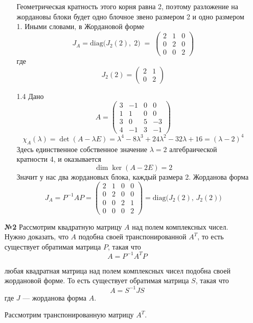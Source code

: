 \documentclass[a4paper]{article}
\begin{document}
\begin{enumerate}
\begin{enumerate}
    Геометрическая кратность этого корня равна 2, поэтому разложение на жордановы 
    блоки будет одно блочное звено размером 2 и одно размером 1.
    Иными словами, в Жордановой форме
    $$
    J_A=\mathrm{diag}\bigl(J_2(2),\;2\bigr)
    \;=\;
    \begin{pmatrix}
    2&1&0\\
    0&2&0\\
    0&0&2
    \end{pmatrix}
    $$
    где
    $$
    J_2(2)=\begin{pmatrix}2&1\\0&2\end{pmatrix}
    $$

    \item[1.4]Дано
    $$
    A=\begin{pmatrix}
    3 & -1 & 0 & 0\\
    1 & 1  & 0 & 0\\
    3 & 0  & 5 & -3\\
    4 & -1 & 3 & -1
    \end{pmatrix}
    $$
    $$
    \chi_A(\lambda)=\det(A-\lambda E)
    =\lambda^4-8\lambda^3+24\lambda^2-32\lambda+16
    =(\lambda-2)^4
    $$
    Здесь единственное собственное значение $\lambda=2$ 
    алгебраической кратности 4, и оказывается
    $$
    \dim\ker(A-2E)=2
    $$
    Значит у нас два жордановых блока, каждый размера 2. Жорданова форма
    $$
    J_A=P^{-1}AP
    =\begin{pmatrix}
    2 & 1 & 0 & 0\\
    0 & 2 & 0 & 0\\
    0 & 0 & 2 & 1\\
    0 & 0 & 0 & 2
    \end{pmatrix}
    =\mathrm{diag}\bigl(J_2(2),\,J_2(2)\bigr)
    $$
    $\;$

  \end{enumerate}

  \item[\textbf{№2}]
  Рассмотрим квадратную матрицу \( A \) над полем комплексных чисел. 
  Нужно доказать, что \( A \) подобна своей транспонированной \( A^T \),
  то есть существует обратимая матрица \( P \), такая что 
  \[ A = P^{-1} A^T P \]

  любая квадратная матрица над полем комплексных чисел подобна 
  своей жордановой форме. То есть существует обратимая матрица \( S \), 
  такая что 
  \[ A = S^{-1} J S \]
  где \( J \) — жорданова форма \( A \).

  Рассмотрим транспонированную матрицу \( A^T \).
  

\end{enumerate}
\end{document}
